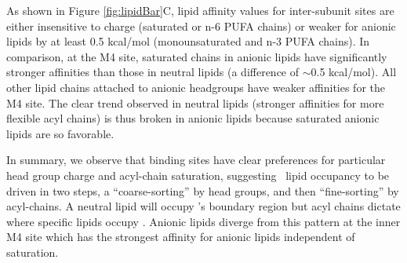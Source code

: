 As shown in Figure \ref{fig:lipidBar}C, lipid affinity values for inter-subunit sites are either insensitive to charge (saturated or n-6 PUFA chains) or weaker for anionic lipids by at least 0.5 kcal/mol (monounsaturated and n-3 PUFA chains).  In comparison, at the M4 site, saturated chains in anionic lipids have significantly stronger affinities than those in neutral lipids (a difference of $\sim$0.5 kcal/mol). All other lipid chains attached to anionic headgroups have weaker affinities for the M4 site. The clear trend observed in neutral lipids (stronger affinities for more flexible acyl chains) is thus broken in anionic lipids because saturated anionic lipids are so favorable.  %

In summary, we observe that binding sites have clear preferences for particular head group charge and acyl-chain saturation, suggesting \nachr~lipid occupancy to be driven in two steps, a ``coarse-sorting'' by head groups, and then ``fine-sorting'' by acyl-chains.  A neutral lipid will occupy \nachr's boundary region but acyl chains dictate where specific lipids occupy \nachr. Anionic lipids diverge from this pattern at the inner M4 site which has the strongest affinity for anionic lipids independent of saturation. 

